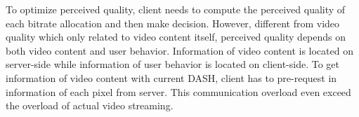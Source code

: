 To optimize perceived quality, client needs to compute the perceived quality of each bitrate allocation and then make decision. However, different from video quality which only related to video content itself, perceived quality depends on both video content and user behavior. Information of video content is located on server-side while information of user behavior is located on client-side. To get information of video content with current DASH, client has to pre-request in information of each pixel from server. This communication overload even exceed the overload of actual video streaming.



